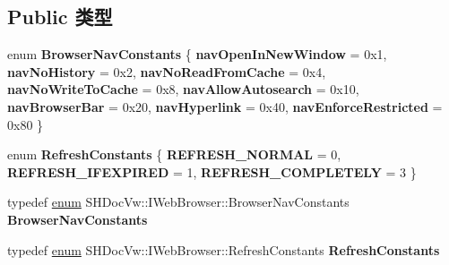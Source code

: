 \subsection*{Public 类型}
\begin{DoxyCompactItemize}
\item 
\mbox{\label{interface_s_h_doc_vw_1_1_i_web_browser_a6a8b66316bd6c89ac06be7ec6aeff525}} 
enum {\bfseries Browser\+Nav\+Constants} \{ \newline
{\bfseries nav\+Open\+In\+New\+Window} = 0x1, 
{\bfseries nav\+No\+History} = 0x2, 
{\bfseries nav\+No\+Read\+From\+Cache} = 0x4, 
{\bfseries nav\+No\+Write\+To\+Cache} = 0x8, 
\newline
{\bfseries nav\+Allow\+Autosearch} = 0x10, 
{\bfseries nav\+Browser\+Bar} = 0x20, 
{\bfseries nav\+Hyperlink} = 0x40, 
{\bfseries nav\+Enforce\+Restricted} = 0x80
 \}
\item 
\mbox{\label{interface_s_h_doc_vw_1_1_i_web_browser_a1c99717009407c600961918e9efa74dd}} 
enum {\bfseries Refresh\+Constants} \{ {\bfseries R\+E\+F\+R\+E\+S\+H\+\_\+\+N\+O\+R\+M\+AL} = 0, 
{\bfseries R\+E\+F\+R\+E\+S\+H\+\_\+\+I\+F\+E\+X\+P\+I\+R\+ED} = 1, 
{\bfseries R\+E\+F\+R\+E\+S\+H\+\_\+\+C\+O\+M\+P\+L\+E\+T\+E\+LY} = 3
 \}
\item 
\mbox{\label{interface_s_h_doc_vw_1_1_i_web_browser_aa4758637b657014b6b7782350e3ab84e}} 
typedef \hyperlink{interfaceenum}{enum} S\+H\+Doc\+Vw\+::\+I\+Web\+Browser\+::\+Browser\+Nav\+Constants {\bfseries Browser\+Nav\+Constants}
\item 
\mbox{\label{interface_s_h_doc_vw_1_1_i_web_browser_a81dbc10caec95edaae1aaa37ae2654b4}} 
typedef \hyperlink{interfaceenum}{enum} S\+H\+Doc\+Vw\+::\+I\+Web\+Browser\+::\+Refresh\+Constants {\bfseries Refresh\+Constants}
\end{DoxyCompactItemize}
